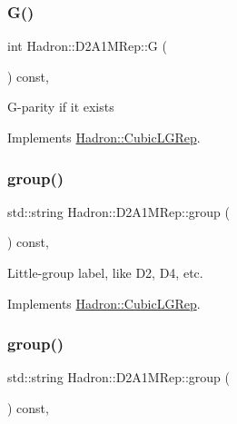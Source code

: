 \subsubsection{\texorpdfstring{G()}{G()}\hspace{0.1cm}{\footnotesize\ttfamily [2/2]}}
{\footnotesize\ttfamily int Hadron\+::\+D2\+A1\+M\+Rep\+::G (\begin{DoxyParamCaption}{ }\end{DoxyParamCaption}) const\hspace{0.3cm}{\ttfamily [inline]}, {\ttfamily [virtual]}}

G-\/parity if it exists 

Implements \mbox{\hyperlink{structHadron_1_1CubicLGRep_ace26f7b2d55e3a668a14cb9026da5231}{Hadron\+::\+Cubic\+L\+G\+Rep}}.

\mbox{\label{structHadron_1_1D2A1MRep_a8d1ad4d399b153870478b6e636ee0131}} 
\subsubsection{\texorpdfstring{group()}{group()}\hspace{0.1cm}{\footnotesize\ttfamily [1/2]}}
{\footnotesize\ttfamily std\+::string Hadron\+::\+D2\+A1\+M\+Rep\+::group (\begin{DoxyParamCaption}{ }\end{DoxyParamCaption}) const\hspace{0.3cm}{\ttfamily [inline]}, {\ttfamily [virtual]}}

Little-\/group label, like D2, D4, etc. 

Implements \mbox{\hyperlink{structHadron_1_1CubicLGRep_a9bdb14b519a611d21379ed96a3a9eb41}{Hadron\+::\+Cubic\+L\+G\+Rep}}.

\mbox{\label{structHadron_1_1D2A1MRep_a8d1ad4d399b153870478b6e636ee0131}} 
\subsubsection{\texorpdfstring{group()}{group()}\hspace{0.1cm}{\footnotesize\ttfamily [2/2]}}
{\footnotesize\ttfamily std\+::string Hadron\+::\+D2\+A1\+M\+Rep\+::group (\begin{DoxyParamCaption}{ }\end{DoxyParamCaption}) const\hspace{0.3cm}{\ttfamily [inline]}, {\ttfamily [virtual]}}

